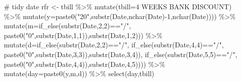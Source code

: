 \documentclass[
  a4paper,
  DIV=11,
  numbers=noendperiod]{scrreprt}
\newenvironment{Shaded}{\begin{snugshade}}{\end{snugshade}}
\newcommand{\AttributeTok}[1]{\textcolor[rgb]{0.40,0.45,0.13}{#1}}
\newcommand{\CommentTok}[1]{\textcolor[rgb]{0.37,0.37,0.37}{#1}}
\newcommand{\DecValTok}[1]{\textcolor[rgb]{0.68,0.00,0.00}{#1}}
\newcommand{\FunctionTok}[1]{\textcolor[rgb]{0.28,0.35,0.67}{#1}}
\newcommand{\NormalTok}[1]{\textcolor[rgb]{0.00,0.23,0.31}{#1}}
\newcommand{\OtherTok}[1]{\textcolor[rgb]{0.00,0.23,0.31}{#1}}
\newcommand{\SpecialCharTok}[1]{\textcolor[rgb]{0.37,0.37,0.37}{#1}}
\newcommand{\StringTok}[1]{\textcolor[rgb]{0.13,0.47,0.30}{#1}}
\begin{document}
\begin{Shaded}
\begin{Highlighting}[]
\CommentTok{\# tidy date}
\NormalTok{rfr }\OtherTok{\textless{}{-}}\NormalTok{ tbill }\SpecialCharTok{\%\textgreater{}\%} \FunctionTok{mutate}\NormalTok{(}\AttributeTok{tbill=}\StringTok{\textasciigrave{}}\AttributeTok{4 WEEKS BANK DISCOUNT}\StringTok{\textasciigrave{}}\NormalTok{) }\SpecialCharTok{\%\textgreater{}\%} 
  \FunctionTok{mutate}\NormalTok{(}\AttributeTok{y=}\FunctionTok{paste0}\NormalTok{(}\StringTok{"20"}\NormalTok{,}\FunctionTok{substr}\NormalTok{(Date,}\FunctionTok{nchar}\NormalTok{(Date)}\SpecialCharTok{{-}}\DecValTok{1}\NormalTok{,}\FunctionTok{nchar}\NormalTok{(Date)))) }\SpecialCharTok{\%\textgreater{}\%} 
  \FunctionTok{mutate}\NormalTok{(}\AttributeTok{m=}\FunctionTok{if\_else}\NormalTok{(}\FunctionTok{substr}\NormalTok{(Date,}\DecValTok{2}\NormalTok{,}\DecValTok{2}\NormalTok{)}\SpecialCharTok{==}\StringTok{"/"}\NormalTok{,}
                   \FunctionTok{paste0}\NormalTok{(}\StringTok{"0"}\NormalTok{,}\FunctionTok{substr}\NormalTok{(Date,}\DecValTok{1}\NormalTok{,}\DecValTok{1}\NormalTok{)),}\FunctionTok{substr}\NormalTok{(Date,}\DecValTok{1}\NormalTok{,}\DecValTok{2}\NormalTok{))) }\SpecialCharTok{\%\textgreater{}\%} 
  \FunctionTok{mutate}\NormalTok{(}\AttributeTok{d=}\FunctionTok{if\_else}\NormalTok{(}\FunctionTok{substr}\NormalTok{(Date,}\DecValTok{2}\NormalTok{,}\DecValTok{2}\NormalTok{)}\SpecialCharTok{==}\StringTok{"/"}\NormalTok{,}
                   \FunctionTok{if\_else}\NormalTok{(}\FunctionTok{substr}\NormalTok{(Date,}\DecValTok{4}\NormalTok{,}\DecValTok{4}\NormalTok{)}\SpecialCharTok{==}\StringTok{"/"}\NormalTok{,}
                           \FunctionTok{paste0}\NormalTok{(}\StringTok{"0"}\NormalTok{,}\FunctionTok{substr}\NormalTok{(Date,}\DecValTok{3}\NormalTok{,}\DecValTok{3}\NormalTok{)),}\FunctionTok{substr}\NormalTok{(Date,}\DecValTok{3}\NormalTok{,}\DecValTok{4}\NormalTok{)),}
                   \FunctionTok{if\_else}\NormalTok{(}\FunctionTok{substr}\NormalTok{(Date,}\DecValTok{5}\NormalTok{,}\DecValTok{5}\NormalTok{)}\SpecialCharTok{==}\StringTok{"/"}\NormalTok{,}
                           \FunctionTok{paste0}\NormalTok{(}\StringTok{"0"}\NormalTok{,}\FunctionTok{substr}\NormalTok{(Date,}\DecValTok{4}\NormalTok{,}\DecValTok{4}\NormalTok{)),}\FunctionTok{substr}\NormalTok{(Date,}\DecValTok{4}\NormalTok{,}\DecValTok{5}\NormalTok{)))) }\SpecialCharTok{\%\textgreater{}\%} 
  \FunctionTok{mutate}\NormalTok{(}\AttributeTok{day=}\FunctionTok{paste0}\NormalTok{(y,m,d)) }\SpecialCharTok{\%\textgreater{}\%} 
  \FunctionTok{select}\NormalTok{(day,tbill)}


\end{Highlighting}
\end{Shaded}
\end{document}
